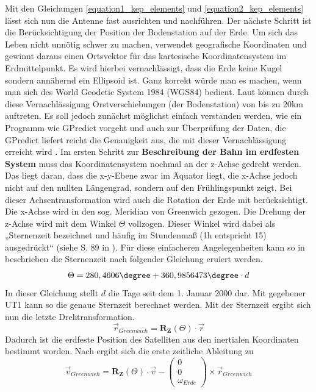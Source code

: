 Mit den Gleichungen \ref{equation1_kep_elements} und \ref{equation2_kep_elements} lässt sich nun die Antenne fast ausrichten und nachführen. Der nächste Schritt ist die Berücksichtigung der Position der Bodenstation auf der Erde. Um sich das Leben nicht unnötig schwer zu machen, verwendet geografische Koordinaten und gewinnt daraus einen Ortsvektor für das kartesische Koordinatensystem im Erdmittelpunkt. Es wird hierbei vernachlässigt, dass die Erde keine Kugel sondern annähernd ein Ellipsoid ist. Ganz korrekt würde man es machen, wenn man sich des World Geodetic System 1984 (WGS84) bedient. Laut \cite{Wiki:Geo} können durch diese Vernachlässigung Orstverschiebungen (der Bodenstation) von bis zu 20km auftreten. Es soll jedoch zunächst möglichst einfach verstanden werden, wie ein Programm wie GPredict vorgeht und auch zur Überprüfung der Daten, die GPredict liefert reicht die Genauigkeit aus, die mit dieser Vernachlässigung erreicht wird .
\newpar  
Im ersten Schritt zur  \textbf{Beschreibung der Bahn im erdfesten System} muss das Koordinatensystem nochmal an der z-Achse gedreht werden. Das liegt daran, dass die x-y-Ebene zwar im Äquator liegt, die x-Achse jedoch nicht auf den nullten Längengrad, sondern auf den Frühlingspunkt zeigt. Bei dieser Achsentransformation wird auch die Rotation der Erde mit berücksichtigt. Die x-Achse wird in den sog. Meridian von Greenwich gezogen. Die Drehung der z-Achse wird mit dem Winkel \ensuremath{\Theta} vollzogen. Dieser Winkel wird dabei als „Sternenzeit bezeichnet und häufig im Stundenmaß (1h entspricht 15\degree) ausgedrückt“ (siehe S. 89 in \cite{HandRaum}). Für diese einfacheren Angelegenheiten kann so in \cite{HandRaum} beschrieben die Sternenzeit nach folgender Gleichung eruiert werden.
\begin{equation}
	\Theta = 280,4606\degree+360,9856473\degree\cdot d
\end{equation} 
In dieser Gleichung stellt \ensuremath{d} die Tage seit dem 1. Januar 2000 dar. Mit gegebener UT1 kann so die genaue Sternzeit berechnet werden. Mit der Sternzeit ergibt sich nun die letzte Drehtransformation. 
\begin{equation}
	\vec{r}_{Greenwich}=\mathbf{R_Z}(\Theta) \cdot \vec{r}
\end{equation} 
Dadurch ist die erdfeste Position des Satelliten aus den inertialen Koordinaten bestimmt worden. Nach \cite{HandRaum} ergibt sich die erste zeitliche Ableitung zu
\begin{equation}
	\vec{v}_{Greenwich}=\mathbf{R_Z}(\Theta)\cdot\vec{v}-\left(\begin{array}{c}0\\0\\\omega_{Erde}\end{array}\right)\times\vec{r}_{Greenwich}
	\label{equation3_kep_elements}
\end{equation}   
